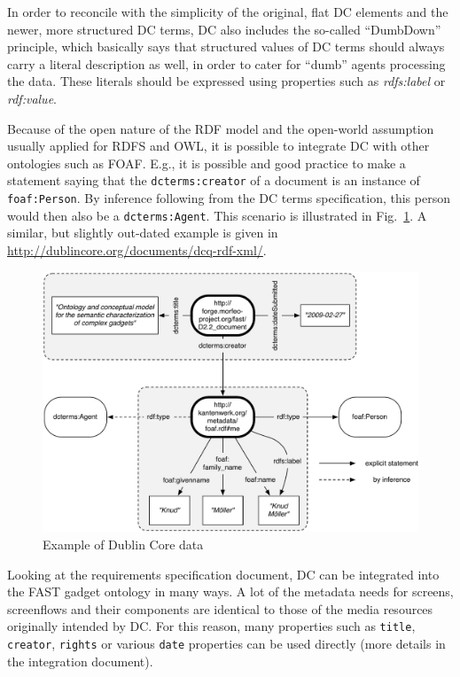 \documentclass[twoside]{fast_latex}
\begin{document}
In order to reconcile with the simplicity of the original, flat DC elements and the newer, more structured DC terms, DC also includes the so-called ``DumbDown'' principle, which basically says that structured values of DC terms should always carry a literal description as well, in order to cater for ``dumb'' agents processing the data. These literals should be expressed using properties such as \emph{rdfs:label} or \emph{rdf:value}.

Because of the open nature of the RDF model and the open-world assumption usually applied for RDFS and OWL, it is possible to integrate DC with other ontologies such as FOAF. E.g., it is possible and good practice to make a statement saying that the \texttt{dcterms:creator} of a document is an instance of \texttt{foaf:Person}. By inference following from the DC terms specification, this person would then also be a \texttt{dcterms:Agent}. This scenario is illustrated in Fig.~\ref{fig:dcterms_example}. A similar, but slightly out-dated example is given in \url{http://dublincore.org/documents/dcq-rdf-xml/}.

\begin{figure}
  \begin{center}
    \includegraphics[width=\linewidth]{images/dcterms_example.pdf}
    \caption{Example of Dublin Core data}
    \label{fig:dcterms_example}
  \end{center}
\end{figure}


Looking at the requirements specification document, DC can be integrated into the FAST gadget ontology in many ways. A lot of the metadata needs for screens, screenflows and their components are identical to those of the media resources originally intended by DC. For this reason, many properties such as \texttt{title}, \texttt{creator}, \texttt{rights} or various \texttt{date} properties can be used directly (more details in the integration document). 
\end{document}
